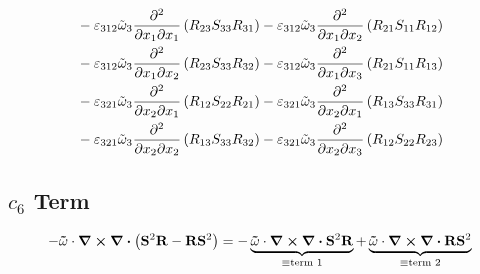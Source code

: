 \begin{equation}
{\begin{split}
                &-\varepsilon_{312}\tilde{\omega}_{3}\pdv{}{x_{1}}{x_{1}}\left(R_{23}S_{33}R_{31}\right)
               -\varepsilon_{312}\tilde{\omega}_{3}\pdv{}{x_{1}}{x_{2}}\left(R_{21}S_{11}R_{12}\right)\\
                &-\varepsilon_{312}\tilde{\omega}_{3}\pdv{}{x_{1}}{x_{2}}\left(R_{23}S_{33}R_{32}\right)
               -\varepsilon_{312}\tilde{\omega}_{3}\pdv{}{x_{1}}{x_{3}}\left(R_{21}S_{11}R_{13}\right)\\
                &-\varepsilon_{321}\tilde{\omega}_{3}\pdv{}{x_{2}}{x_{1}}\left(R_{12}S_{22}R_{21}\right)
               -\varepsilon_{321}\tilde{\omega}_{3}\pdv{}{x_{2}}{x_{1}}\left(R_{13}S_{33}R_{31}\right)\\
                &-\varepsilon_{321}\tilde{\omega}_{3}\pdv{}{x_{2}}{x_{2}}\left(R_{13}S_{33}R_{32}\right)
               -\varepsilon_{321}\tilde{\omega}_{3}\pdv{}{x_{2}}{x_{3}}\left(R_{12}S_{22}R_{23}\right)\\
        \end{split}
        }
\end{equation}
\newpage
\subsection{$c_{6}$ Term}
\begin{equation}
    -\mathbf{\tilde{\omega}}\cdot\curl \div \left( \mathbf{S}^2 \mathbf{R} - \mathbf{R}\mathbf{S}^2\right)=
        - \underbrace{\mathbf{\tilde{\omega}}\cdot\curl \div \mathbf{S}^2 \mathbf{R}}_{\equiv \text{term 1}} 
        + \underbrace{\mathbf{\tilde{\omega}}\cdot\curl \div \mathbf{R} \mathbf{S}^2}_{\equiv \text{term 2}}
\end{equation}
